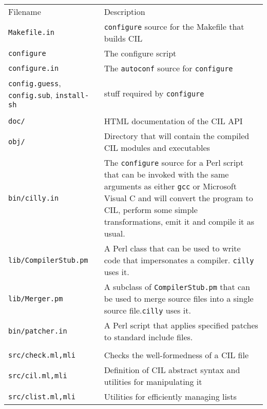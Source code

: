 \documentclass{article}
\def\t#1{{\tt #1}}
\begin{document}
\begin{tabular}{ll}
Filename   & Description \\
\t{Makefile.in}                 & \t{configure} source for the 
                                  Makefile that builds CIL \\
\t{configure}                   & The configure script \\
\t{configure.in}                & The \t{autoconf} source for \t{configure} \\
\t{config.guess}, \t{config.sub}, \t{install-sh} & stuff required by
                                \t{configure} \\
\\
\t{doc/}                        & HTML documentation of the CIL API \\
\t{obj/}                        & Directory that will contain the compiled
                                   CIL modules and executables\\
\t{bin/cilly.in}                & The \t{configure} source for a Perl script 
                                  that can be invoked with the 
                                  same arguments as either \t{gcc} or
                                  Microsoft Visual C and will convert the
                                  program to CIL, perform some simple
                                  transformations, emit it and compile it as
                                  usual. \\
\t{lib/CompilerStub.pm}         & A Perl class that can be used to write code
                                  that impersonates a compiler. \t{cilly}
                                  uses it.  \\
\t{lib/Merger.pm}               &  A subclass of \t{CompilerStub.pm} that can
                                  be used to merge source files into a single
                                  source file.\t{cilly}
                                  uses it. \\
\t{bin/patcher.in}              & A Perl script that applies specified patches
                                  to standard include files.\\
\\
\t{src/check.ml,mli}            & Checks the well-formedness of a CIL file \\
\t{src/cil.ml,mli}              & Definition of CIL abstract syntax and
                                   utilities for manipulating it\\
\t{src/clist.ml,mli}            & Utilities for efficiently managing lists

\end{tabular}
\end{document}
